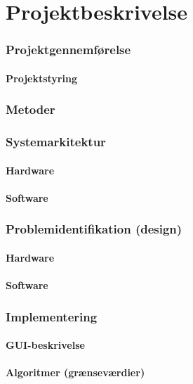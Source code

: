 \chapter{Projektbeskrivelse}
\subsection{Projektgennemførelse}
\subsubsection{Projektstyring}

\subsection{Metoder}

\subsection{Systemarkitektur}
\subsubsection{Hardware}
\subsubsection{Software}

\subsection{Problemidentifikation (design)}
\subsubsection{Hardware}
\subsubsection{Software}

\subsection{Implementering}
\subsubsection{GUI-beskrivelse}
\subsubsection{Algoritmer (grænseværdier)}
